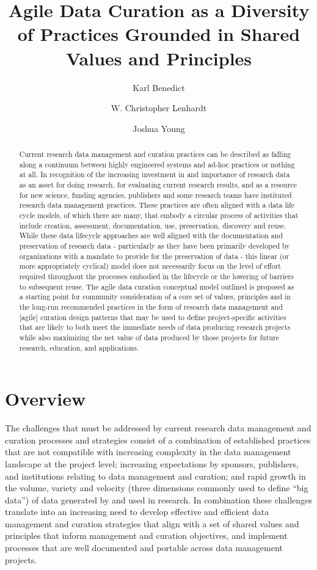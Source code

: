 \documentclass[paper]{ijdc-v9}
\title[Agile Data Curation]{Agile Data Curation as a Diversity of Practices Grounded in Shared
Values and Principles}
\author{Karl Benedict}
\affil{University of New Mexico}
\author{W. Christopher Lenhardt}
\affil{Renaissance Computing Institute}
\author{Joshua Young}
\affil{University Corporation for Atmospheric Research}
\begin{document}
\maketitle

\begin{abstract}
Current research data management and curation practices can be described
as falling along a continuum between highly engineered systems and
ad-hoc practices or nothing at all. In recognition of the increasing
investment in and importance of research data as an asset for doing
research, for evaluating current research results, and as a resource for
new science, funding agencies, publishers and some research teams have
instituted research data management practices. These practices are often
aligned with a data life cycle models, of which there are many, that
embody a circular process of activities that include creation,
assessment, documentation, use, preservation, discovery and reuse. While
these data lifecycle approaches are well aligned with the documentation
and preservation of research data - particularly as they have been
primarily developed by organizations with a mandate to provide for the
preservation of data - this linear (or more appropriately cyclical)
model does not necessarily focus on the level of effort required
throughout the processes embodied in the lifecycle or the lowering of
barriers to subsequent reuse. The agile data curation conceptual model
outlined is proposed as a starting point for community consideration of
a core set of values, principles and in the long-run recommended
practices in the form of research data management and {[}agile{]}
curation design patterns that may be used to define project-specific
activities that are likely to both meet the immediate needs of data
producing research projects while also maximizing the net value of data
produced by those projects for future research, education, and
applications.
\end{abstract}

\section{Overview}\label{overview}

The challenges that must be addressed by current research data
management and curation processes and strategies consist of a
combination of established practices that are not compatible with
increasing complexity in the data management landscape at the project
level; increasing expectations by sponsors, publishers, and institutions
relating to data management and curation; and rapid growth in the
volume, variety and velocity (three dimensions commonly used to define
``big data'') of data generated by and used in research. In combination
these challenges translate into an increasing need to develop effective
and efficient data management and curation strategies that align with a
set of shared values and principles that inform management and curation
objectives, and implement processes that are well documented and
portable across data management projects.
\end{document}
